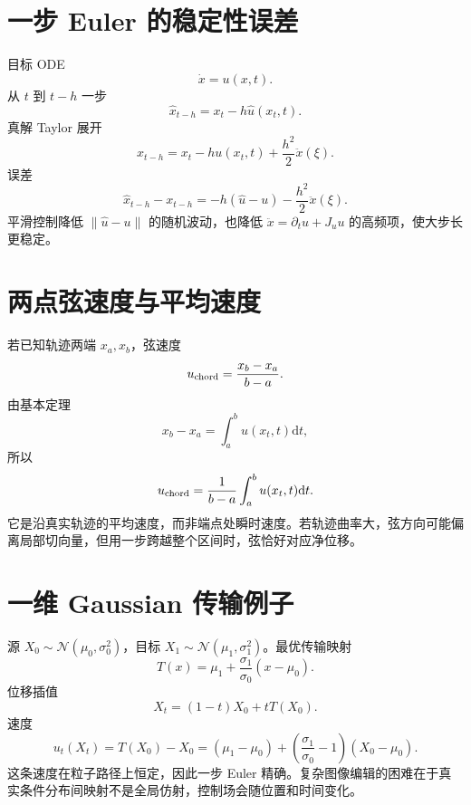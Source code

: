 \documentclass[UTF8,12pt,a4paper,fontset=none]{ctexart}
\numberwithin{equation}{section}
\newcommand{\dd}{\mathrm{d}}
\begin{document}
\section{一步 Euler 的稳定性误差}
目标 ODE
\begin{equation}
 \dot x=u(x,t).
\end{equation}
从 $t$ 到 $t-h$ 一步
\begin{equation}
 \widehat x_{t-h}=x_t-h\widehat u(x_t,t).
\end{equation}
真解 Taylor 展开
\begin{equation}
 x_{t-h}=x_t-hu(x_t,t)+
 \frac{h^2}{2}\ddot x(\xi).
\end{equation}
误差
\begin{equation}
 \widehat x_{t-h}-x_{t-h}
 =-h(\widehat u-u)-
 \frac{h^2}{2}\ddot x(\xi).
\end{equation}
平滑控制降低 $\|\widehat u-u\|$ 的随机波动，也降低 $\ddot x=\partial_tu+J_uu$ 的高频项，使大步长更稳定。

\section{两点弦速度与平均速度}
若已知轨迹两端 $x_a,x_b$，弦速度
\begin{equation}
 u_{\rm chord}=\frac{x_b-x_a}{b-a}.
\end{equation}
由基本定理
\begin{equation}
 x_b-x_a=\int_a^bu(x_t,t)\dd t,
\end{equation}
所以
\begin{equation}
 u_{\rm chord}=\frac1{b-a}
 \int_a^bu(x_t,t)\dd t.
\end{equation}
它是沿真实轨迹的平均速度，而非端点处瞬时速度。若轨迹曲率大，弦方向可能偏离局部切向量，但用一步跨越整个区间时，弦恰好对应净位移。

\section{一维 Gaussian 传输例子}
源 $X_0\sim\mathcal N(\mu_0,\sigma_0^2)$，目标 $X_1\sim\mathcal N(\mu_1,\sigma_1^2)$。最优传输映射
\begin{equation}
 T(x)=\mu_1+\frac{\sigma_1}{\sigma_0}(x-\mu_0).
\end{equation}
位移插值
\begin{equation}
 X_t=(1-t)X_0+tT(X_0).
\end{equation}
速度
\begin{equation}
 u_t(X_t)=T(X_0)-X_0
 =(\mu_1-\mu_0)+
 \left(\frac{\sigma_1}{\sigma_0}-1\right)(X_0-\mu_0).
\end{equation}
这条速度在粒子路径上恒定，因此一步 Euler 精确。复杂图像编辑的困难在于真实条件分布间映射不是全局仿射，控制场会随位置和时间变化。
\end{document}
